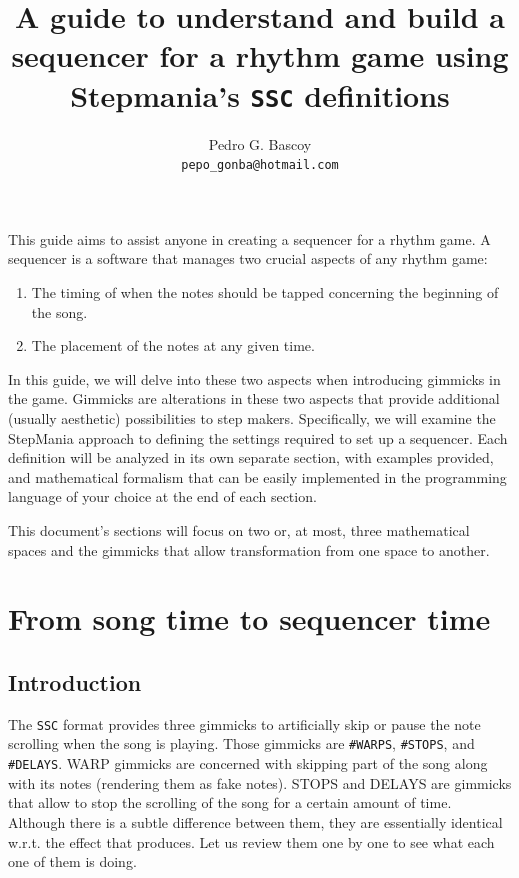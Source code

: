 \documentclass[a4paper,9pt]{article}
\begin{document}
    
\title{A guide to understand and build a sequencer for a rhythm game using Stepmania's \texttt{SSC} definitions}
    \author{
        Pedro G. Bascoy\\
        \texttt{pepo\_gonba@hotmail.com}\\
    }
    \maketitle

This guide aims to assist anyone in creating a sequencer for a rhythm game. A sequencer is a software that manages two crucial aspects of any rhythm game:
    \begin{enumerate}
	    \item The timing of when the notes should be tapped concerning the beginning of the song.
	    \item The placement of the notes at any given time.
    \end{enumerate}

In this guide, we will delve into these two aspects when introducing gimmicks in the game. Gimmicks are alterations in these two aspects that provide additional (usually aesthetic) possibilities to step makers. Specifically, we will examine the StepMania approach to defining the settings required to set up a sequencer. Each definition will be analyzed in its own separate section, with examples provided, and mathematical formalism that can be easily implemented in the programming language of your choice at the end of each section.

This document's sections will focus on two or, at most, three mathematical spaces and the gimmicks that allow transformation from one space to another.
   
    \section{From song time to sequencer time}\label{sec:songtime2seqtime}
    \subsection{Introduction}

    The \texttt{SSC} format provides three gimmicks to artificially skip or pause the note scrolling when the song is playing. Those gimmicks are \texttt{\#WARPS}, \texttt{\#STOPS}, and \texttt{\#DELAYS}. WARP gimmicks are concerned with skipping part of the song along with its notes (rendering them as fake notes). STOPS and DELAYS are gimmicks that allow to stop the scrolling of the song for a certain amount of time. Although there is a subtle difference between them, they are essentially identical w.r.t. the effect that produces. Let us review them one by one to see what each one of them is doing.
\end{document}
